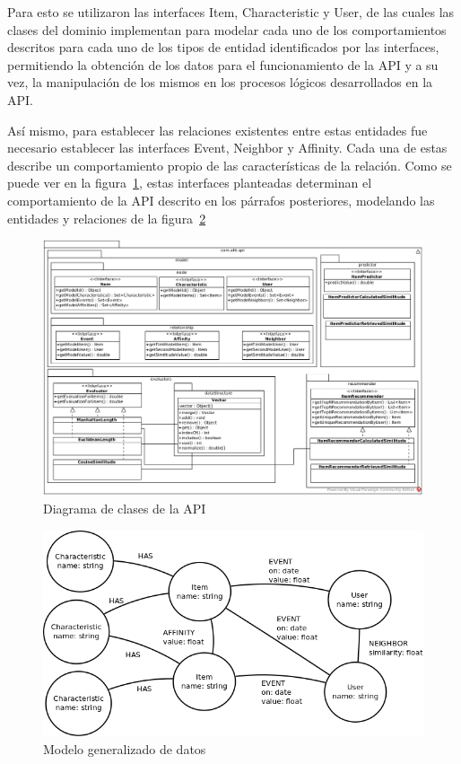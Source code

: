   Para esto se utilizaron las interfaces Item, Characteristic y User, de las cuales las clases del dominio implementan para modelar cada uno de los comportamientos descritos para cada uno de los tipos de entidad identificados por las interfaces, permitiendo la obtención de los datos para el funcionamiento de la API y a su vez, la manipulación de los mismos en los procesos lógicos desarrollados en la API.

  Así mismo, para establecer las relaciones existentes entre estas entidades fue necesario establecer las interfaces Event, Neighbor y Affinity. Cada una de estas describe un comportamiento propio de las características de la relación. Como se puede ver en la figura~\ref{fig:p3_interfaces}, estas interfaces planteadas determinan el comportamiento de la API descrito en los párrafos posteriores, modelando las entidades y relaciones de la figura~\ref{fig:p3_general_model}

  \begin{landscape}
    \begin{figure}[h!]
      \centering
      \includegraphics[width=24cm]{./images/classes_api}
      \caption{Diagrama de clases de la API}
      \label{fig:p3_interfaces}
    \end{figure}
  \end{landscape}

    \begin{figure}[h!]
      \centering
      \includegraphics[width=16cm]{./images/general_data_model}
      \caption{Modelo generalizado de datos}
      \label{fig:p3_general_model}
    \end{figure}

